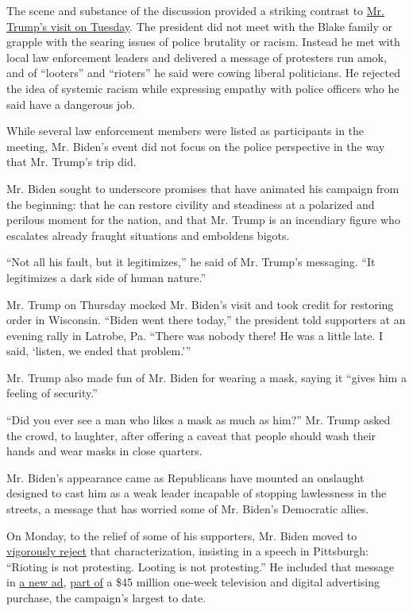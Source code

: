 The scene and substance of the discussion provided a striking contrast
to
\href{https://www.nytimes3xbfgragh.onion/2020/09/01/us/politics/trump-conspiracy-theory-thugs-plane.html?searchResultPosition=1}{Mr.
Trump's visit on Tuesday}. The president did not meet with the Blake
family or grapple with the searing issues of police brutality or racism.
Instead he met with local law enforcement leaders and delivered a
message of protesters run amok, and of ``looters'' and ``rioters'' he
said were cowing liberal politicians. He rejected the idea of systemic
racism while expressing empathy with police officers who he said have a
dangerous job.

While several law enforcement members were listed as participants in the
meeting, Mr. Biden's event did not focus on the police perspective in
the way that Mr. Trump's trip did.

Mr. Biden sought to underscore promises that have animated his campaign
from the beginning: that he can restore civility and steadiness at a
polarized and perilous moment for the nation, and that Mr. Trump is an
incendiary figure who escalates already fraught situations and emboldens
bigots.

``Not all his fault, but it legitimizes,'' he said of Mr. Trump's
messaging. ``It legitimizes a dark side of human nature.''

Mr. Trump on Thursday mocked Mr. Biden's visit and took credit for
restoring order in Wisconsin. ``Biden went there today,'' the president
told supporters at an evening rally in Latrobe, Pa. ``There was nobody
there! He was a little late. I said, `listen, we ended that problem.'''

Mr. Trump also made fun of Mr. Biden for wearing a mask, saying it
``gives him a feeling of security.''

``Did you ever see a man who likes a mask as much as him?'' Mr. Trump
asked the crowd, to laughter, after offering a caveat that people should
wash their hands and wear masks in close quarters.

Mr. Biden's appearance came as Republicans have mounted an onslaught
designed to cast him as a weak leader incapable of stopping lawlessness
in the streets, a message that has worried some of Mr. Biden's
Democratic allies.

On Monday, to the relief of some of his supporters, Mr. Biden moved to
\href{https://www.nytimes3xbfgragh.onion/2020/08/31/us/politics/biden-speech-trump.html}{vigorously
reject} that characterization, insisting in a speech in Pittsburgh:
``Rioting is not protesting. Looting is not protesting.'' He included
that message in
\href{https://www.youtube.com/watch?v=LgHXJ3rdOn0\&feature=youtu.be}{a
new ad},
\href{https://www.nytimes3xbfgragh.onion/live/2020/09/02/us/trump-vs-biden/biden-and-trump-release-dueling-ads-on-public-safety-in-swing-states}{part
of} a \$45 million one-week television and digital advertising purchase,
the campaign's largest to date.

